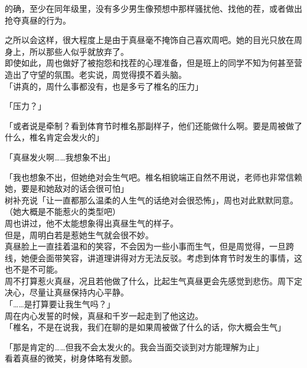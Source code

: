 的确，至少在同年级里，没有多少男生像预想中那样骚扰他、找他的茬，或者做出抢夺真昼的行为。

之所以会这样，很大程度上是由于真昼毫不掩饰自己喜欢周吧。她的目光只放在周身上，所以那些人似乎就放弃了。\\

即使如此，周也做好了被抱怨和找茬的心理准备，但是班上的同学不知为何甚至营造出了守望的氛围。老实说，周觉得摸不着头脑。\\

「讲真的，周什么事都没有，也是多亏了椎名的压力」

「压力？」

「或者说是牵制？看到体育节时椎名那副样子，他们还能做什么啊。要是周被做了什么，椎名肯定会发火的」

「真昼发火啊……我想象不出」

「我也想象不出，但她绝对会生气吧。椎名相貌端正自然不用说，老师也非常信赖她，要是和她敌对的话会很可怕」\\

树补充说「让一直都那么温柔的人生气的话绝对会很恐怖」，周也对此默默同意。\\

（她大概是不能惹火的类型吧）\\

周也讲过，他不太能想象得出真昼生气的样子。\\

但是，周明白若是惹她生气就会很不妙。\\

真昼脸上一直挂着温和的笑容，不会因为一些小事而生气，但是周觉得，一旦跨线，她便会面带笑容，讲道理讲得对方无法反驳。考虑到体育节时发生的事情，这也不是不可能。\\

周不打算惹火真昼，况且若他做了什么，比起生气真昼更会先感觉到悲伤。周下定决心，尽量让真昼保持内心平静。\\

「……是打算要让我生气吗？」\\

周在内心发誓的时候，真昼和千岁一起走到了他这边。\\

「椎名，不是在说我，我们在聊的是如果周被做了什么的话，你大概会生气」

「那是肯定的……但我不会太发火的。我会当面交谈到对方能理解为止」\\

看着真昼的微笑，树身体略有发颤。\\

